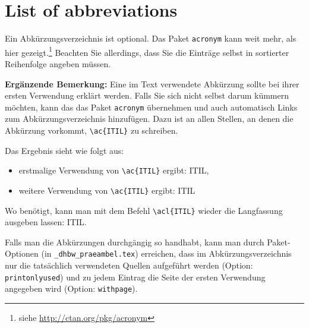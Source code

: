 \chapter*{List of abbreviations}

Ein Abkürzungsverzeichnis ist optional. Das Paket \verb|acronym| kann weit mehr, als hier gezeigt.\footnote{siehe \url{http://ctan.org/pkg/acronym}}
Beachten Sie allerdings, dass Sie die Einträge selbst in sortierter Reihenfolge angeben müssen.

\begin{acronym}[RBM] 


\end{acronym}

\vspace{2em}
{\footnotesize
\textbf{Ergänzende Bemerkung:}
Eine im Text verwendete Abkürzung sollte bei ihrer ersten Verwendung erklärt werden. Falls Sie sich nicht selbst darum kümmern möchten, kann das das Paket \verb|acronym| übernehmen und auch automatisch Links zum Abkürzungsverzeichnis hinzufügen. Dazu ist an allen Stellen, an denen die Abkürzung vorkommt, \verb|\ac{ITIL}| zu schreiben. 

Das Ergebnis sieht wie folgt aus: 
\begin{itemize}
\item erstmalige Verwendung von \verb|\ac{ITIL}| ergibt: \ac{ITIL},
\item weitere Verwendung von \verb|\ac{ITIL}| ergibt: \ac{ITIL}
\end{itemize}
Wo benötigt, kann man mit dem Befehl \verb|\acl{ITIL}| wieder die Langfassung ausgeben lassen: \acl{ITIL}.

Falls man die Abkürzungen durchgängig so handhabt, kann man durch Paket-Optionen (in \verb|_dhbw_praeambel.tex|)
erreichen, dass im Abkürzungsverzeichnis nur die tatsächlich verwendeten Quellen aufgeführt werden (Option: \verb|printonlyused|) und zu jedem Eintrag die Seite der ersten Verwendung angegeben wird (Option: \verb|withpage|).
}
